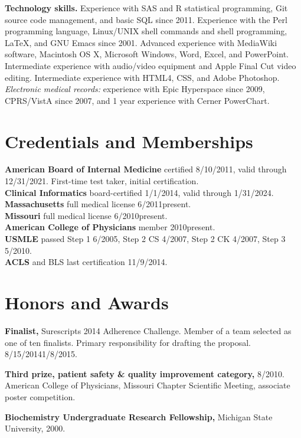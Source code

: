 \documentclass[12pt]{article}
\begin{document}
\textbf{Technology skills.} Experience with SAS and R statistical
programming, Git source code management, and basic SQL since 2011.
Experience with the Perl programming language, Linux/UNIX shell
commands and shell programming, \LaTeX, and GNU Emacs since 2001.
Advanced experience with MediaWiki software, Macintosh OS X, Microsoft
Windows, Word, Excel, and PowerPoint. Intermediate experience with
audio/video equipment and Apple Final Cut video editing. Intermediate
experience with HTML4, CSS, and Adobe Photoshop. \emph{Electronic
  medical records:} experience with Epic Hyperspace since 2009,
CPRS/VistA since 2007, and 1 year experience with Cerner PowerChart.


\section*{Credentials and Memberships}

\textbf{American Board of Internal Medicine} certified 8/10/2011,
valid through 12/31/2021. First-time test taker, initial
certification.\\
\textbf{Clinical Informatics} board-certified 1/1/2014, valid through
1/31/2024.\\
\textbf{Massachusetts} full medical license 6/2011\ndash{}present.\\
\textbf{Missouri} full medical license 6/2010\ndash{}present.\\
\textbf{American College of Physicians} member 2010\ndash{}present.\\
\textbf{USMLE} passed Step 1 6/2005, Step 2 CS 4/2007, Step 2 CK 4/2007, Step 3
5/2010.\\
\textbf{ACLS} and BLS last certification 11/9/2014.

\section*{Honors and Awards}

\textbf{Finalist,} Surescripts 2014 Adherence Challenge. Member of a
team selected as one of ten finalists. Primary responsibility for
drafting the proposal. 8/15/2014\ndash{}1/8/2015.

\textbf{Third prize, patient safety \& quality improvement category,}
8/2010. American College of Physicians, Missouri Chapter Scientific
Meeting, associate poster competition.

\textbf{Biochemistry Undergraduate Research Fellowship,} Michigan
State University, 2000.
\end{document}
